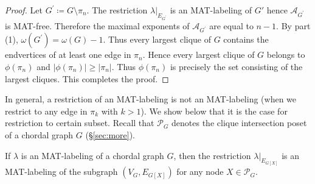 \documentclass[ALCO, Unicode,published]{cedram}
\begin{document}
\begin{proof}
Let $ G^{\prime} \coloneqq G\setminus \pi_{n} $. 
The restriction $ \lambda|_{E_{G^{\prime}}} $ is an MAT-labeling of $G'$ hence $ \mathcal{A}_{G^{\prime}} $ is MAT-free. 
Therefore the maximal exponents of $ \mathcal{A}_{G^{\prime}} $ are equal to $ n-1 $.
By part (1), $ \omega(G^{\prime}) = \omega(G)-1 $. 
Thus every largest clique of $ G $ contains the endvertices of at least one edge in $ \pi_{n} $. 
Hence every largest clique of $ G $ belongs to $ \phi(\pi_{n}) $ and $ |\phi(\pi_{n})| \geq  |\pi_{n}|  $. 
Thus $ \phi(\pi_{n}) $ is precisely the set consisting of the largest cliques. 
This completes the proof. 
\end{proof}

In general, a restriction of an MAT-labeling is not an MAT-labeling (\eg  when we restrict to any edge in $\pi_k$ with $k>1$). 
We show below that it is the case for restriction to certain subset. 
Recall that  $ \mathcal{P}_{G} $ denotes the clique intersection poset of a chordal graph $ G $ (\S \ref{sec:more}). 
\begin{lemma}\label{restriction to intersection of maximal cliques}
If $ \lambda $ is an MAT-labeling of a chordal graph $ G $, then the restriction $ \lambda|_{E_{G[X]}} $ is an MAT-labeling of the subgraph $ (V_{G}, E_{G[X]}) $ for any node $ X \in \mathcal{P}_{G} $. 
\end{lemma}
\end{document}
